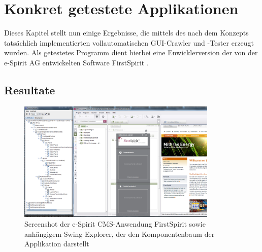 \chapter{Konkret getestete Applikationen}\label{chapter:concretetests}


Dieses Kapitel stellt nun einige Ergebnisse, die mittels des nach dem Konzepts tatsächlich
implementierten vollautomatischen GUI-Crawler und -Tester erzeugt wurden.
Als getestetes Programm dient hierbei eine Enwicklerversion der von der
e-Spirit AG entwickelten Software FirstSpirit \cite{website:firstspirit}.


\section{Resultate}\label{section:testresults}

\begin{figure}
	\centering
	\includegraphics[angle=90,width=0.85\textwidth]{bilder/screenshot_freespirit.png}
	\caption{Screenshot der e-Spirit CMS-Anwendung FirstSpirit \cite{website:firstspirit} 
	sowie anhängigem Swing Explorer, der den Komponentenbaum der Applikation darstellt}
	\label{fig:screenshot_freespirit}
\end{figure}


